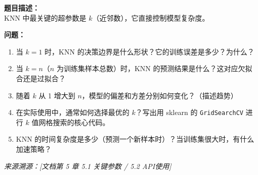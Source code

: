 \documentclass[a4paper,11pt]{ctexart}
\begin{document}
\begin{problembox}
    \textbf{题目描述：}\\
    KNN 中最关键的超参数是 $k$（近邻数），它直接控制模型复杂度。

    \vspace{0.2cm}
    \textbf{问题：}
    \begin{enumerate}[(1)]
        \item 当 $k=1$ 时，KNN 的决策边界是什么形状？它的训练误差是多少？为什么？

        \item 当 $k=n$（$n$ 为训练集样本总数）时，KNN 的预测结果是什么？这对应欠拟合还是过拟合？

        \item 随着 $k$ 从 1 增大到 $n$，模型的偏差和方差分别如何变化？（描述趋势）

        \item 在实际使用中，通常如何选择最优的 $k$？写出用 sklearn 的 \texttt{GridSearchCV} 进行 $k$ 值网格搜索的核心代码。

        \item KNN 的时间复杂度是多少（预测一个新样本时）？当训练集很大时，有什么加速策略？
    \end{enumerate}
    {\color{gray}\small\textit{来源溯源：[文档第 5 章 5.1 关键参数 / 5.2 API使用]}}
\end{problembox}
\end{document}
